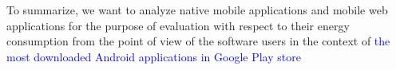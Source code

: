 

To summarize, we want to analyze native mobile applications and mobile web applications %
for the purpose of evaluation %
with respect to their energy consumption %
from the point of view of the software users %
in the context of  \textcolor{blue}{ the most downloaded Android applications in Google Play store} %


